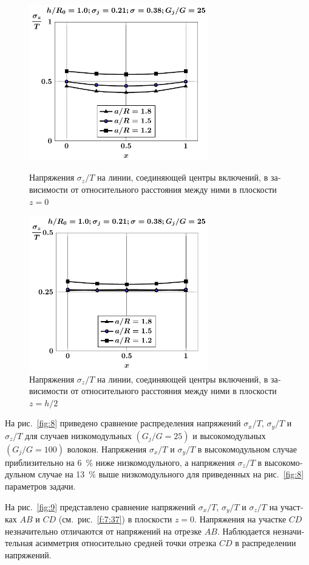 \begin{russian}
\begin{figure}[h!]
\centering\footnotesize
\parbox[b]{7.5cm}{\centering\includegraphics[width=7.8cm]{inc16-a-h10-r10-g25-z0-sig-z.pdf}
\caption{Напряжения $\sigma_z/T$ на линии, соединяющей центры включений, в зависимости от относительного расстояния между ними в плоскости $z=0$
\label{fig:6}}}\hfil\hfil
\parbox[b]{7.5cm}{\centering\includegraphics[width=7.8cm]{inc16-a-h10-r10-g25-z1-sig-z.pdf}
\caption{Напряжения $\sigma_z/T$ на линии, соединяющей центры включений, в зависимости от относительного расстояния между ними в плоскости $z=h/2$
\label{fig:7}
}}
\end{figure}

На рис.~\ref{fig:8} приведено сравнение распределения напряжений $\sigma_x/T$, $\sigma_y/T$ и $\sigma_z/T$ для случаев низкомодульных $(G_j/G=25)$ и высокомодульных $(G_j/G=100)$ волокон. Напряжения $\sigma_x/T$ и $\sigma_y/T$ в высокомодульном случае приблизительно на 6~\% ниже низкомодульного, а напряжения $\sigma_z/T$ в высокомодульном случае на 13~\% выше низкомодульного для приведенных на рис.~\ref{fig:8} параметров задачи.

На рис.~\ref{fig:9} представлено сравнение напряжений $\sigma_x/T$, $\sigma_y/T$ и $\sigma_z/T$ на участках $AB$ и $CD$ (см.~рис.~\ref{f:7:37}) в плоскости $z=0$. Напряжения на участке $CD$ незначительно отличаются от напряжений на отрезке $AB$. Наблюдается незначительная асимметрия относительно средней точки отрезка $CD$ в распределении напряжений.


\end{russian}
